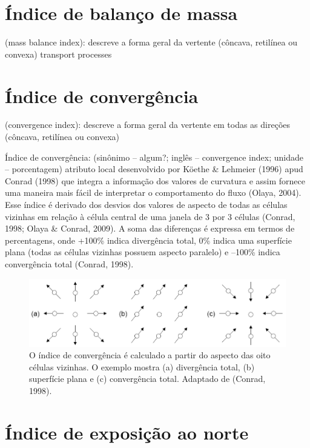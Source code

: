 \documentclass[]{book}
\begin{document}
\section{Índice de balanço de massa}\label{indice-de-balanco-de-massa}

(mass balance index): descreve a forma geral da vertente (côncava,
retilínea ou convexa) transport processes

\section{Índice de convergência}\label{indice-de-convergencia}

(convergence index): descreve a forma geral da vertente em todas as
direções (côncava, retilínea ou convexa)

Índice de convergência: (sinônimo -- algum?; inglês -- convergence
index; unidade -- porcentagem) atributo local desenvolvido por Köethe \&
Lehmeier (1996) apud Conrad (1998) que integra a informação dos valores
de curvatura e assim fornece uma maneira mais fácil de interpretar o
comportamento do fluxo (Olaya, 2004). Esse índice é derivado dos desvios
dos valores de aspecto de todas as células vizinhas em relação à célula
central de uma janela de 3 por 3 células (Conrad, 1998; Olaya \& Conrad,
2009). A soma das diferenças é expressa em termos de percentagens, onde
+100\% indica divergência total, 0\% indica uma superfície plana (todas
as células vizinhas possuem aspecto paralelo) e --100\% indica
convergência total (Conrad, 1998).

\begin{figure}[htbp]
\centering
\includegraphics{images/convergence-index.png}
\caption{O índice de convergência é calculado a partir do aspecto das
oito células vizinhas. O exemplo mostra (a) divergência total, (b)
superfície plana e (c) convergência total. Adaptado de (Conrad, 1998).}
\end{figure}

\section{Índice de exposição ao
norte}\label{indice-de-exposicao-ao-norte}
\end{document}

